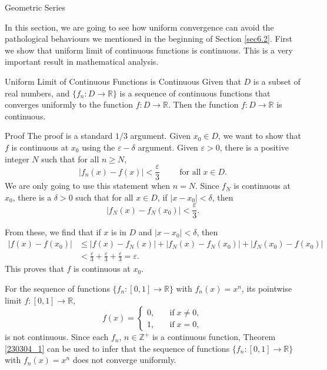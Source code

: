\begin{example}[label=230305_16]{Geometric Series}
\begin{example}[label=230304_9]{}
In this section, we are going to see how uniform convergence can avoid the pathological behaviours we mentioned in the beginning of Section \ref{sec6.2}. First we show that uniform limit of continuous functions is continuous. This is a very important result in mathematical analysis.
\begin{theorem}[label=230304_1]{Uniform Limit of Continuous Functions is Continuous}
Given that $D$ is a subset of real numbers, and $\{f_n:D\to\mathbb{R}\}$ is a sequence of continuous functions that converges uniformly to the function $f:D\to\mathbb{R}$. Then the function  $f:D\to\mathbb{R}$ is continuous. 
\end{theorem}\begin{myproof}{Proof}
The proof is a standard $1/3$ argument. Given $x_0\in D$, we want to show that $f$ is continuous at $x_0$ using the $\varepsilon-\delta$ argument. Given $\varepsilon>0$, there is a positive integer $N$ such that for all $n\geq N$, 
\[|f_n(x)-f(x)|<\frac{\varepsilon}{3}\hspace{1cm}\text{for all}\;x\in D.\]We are only going to use this statement when $n=N$.
Since $f_N$ is continuous at $x_0$, there is a $\delta>0$ such that for all $x\in D$, if $|x-x_0|<\delta$, then
\[|f_N(x)-f_N(x_0)|<\frac{\varepsilon}{3}.\]

From these, we find that if $x$ is in $D$ and $|x-x_0|<\delta$, then
\begin{align*}
|f(x)-f(x_0)|&\leq |f(x)-f_N(x)|+|f_N(x)-f_N(x_0)|+|f_N(x_0)-f(x_0)|\\&<\frac{\varepsilon}{3}+\frac{\varepsilon}{3}+\frac{\varepsilon}{3}=\varepsilon.\end{align*}This proves that $f$ is continuous at $x_0$.
 
\end{myproof}
\begin{example}{}
 For the sequence of functions $\{f_n:[0,1]\to\mathbb{R}\}$ with $f_n(x)=x^n$, its pointwise limit $f:[0,1]\to\mathbb{R}$,  \[f(x)=\begin{cases}0,\quad &\text{if}\;x\neq 0,\\1,\quad &\text{if}\; x=0,\end{cases}\]
is  not continuous. Since  each $f_n$, $n\in\mathbb{Z}^+$ is a continuous function,
  Theorem \ref{230304_1} can be used to infer that the sequence of functions  $\{f_n:[0,1]\to\mathbb{R}\}$ with $f_n(x)=x^n$  does not converge uniformly.  


\end{example}
\end{example}
\end{example}
